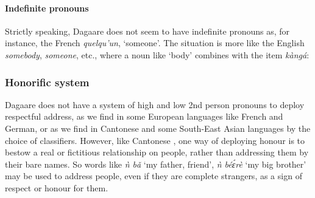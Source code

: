 \ea \label{ex:interrpronounssents} 
\z\z

\paragraph{Indefinite pronouns}



Strictly speaking, Dagaare does not seem to have indefinite pronouns as, for
instance, the French \textit{quelqu’un}, ‘someone’. The situation is more like the English \textit{somebody},
\textit{someone}, etc., where a noun like `body' combines with the item \textit{kàngá}:

\ea {}
\z\z

\subsubsection{Honorific system}
Dagaare does not have a system of high and low 2nd person pronouns to deploy
respectful address, as we find in some  European languages like French and German,
or as we find in Cantonese and some South-East Asian languages by the choice of classifiers.
However, like Cantonese \citep{Siew-Yue1993}, one way of deploying honour is to bestow a real or
fictitious relationship on people, rather than addressing them by their bare names. So words
like \textit{ǹ bǎ} ‘my father, friend’, \textit{ǹ béɛ́rè} ‘my big brother’ may be used to address people, even if
they are complete strangers, as a sign of respect or honour for them.

